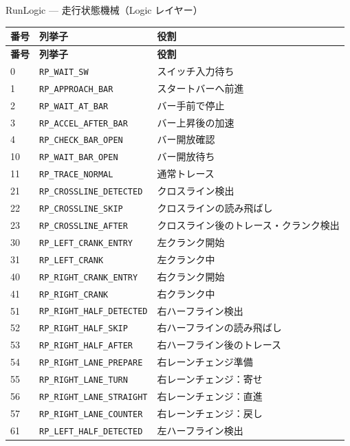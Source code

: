 \documentclass[a4paper,11pt,dvipdfmx]{jsarticle}
\begin{document}
\begin{apibox}{RunLogic --- 走行状態機械（Logic レイヤー）}
\begin{longtable}{l l l}
\toprule
\textbf{番号} & \textbf{列挙子} & \textbf{役割} \\
\midrule
\endfirsthead
\toprule
\textbf{番号} & \textbf{列挙子} & \textbf{役割} \\
\midrule
\endhead
0   & \texttt{RP\_WAIT\_SW}             & スイッチ入力待ち \\
1   & \texttt{RP\_APPROACH\_BAR}        & スタートバーへ前進 \\
2   & \texttt{RP\_WAIT\_AT\_BAR}        & バー手前で停止 \\
3   & \texttt{RP\_ACCEL\_AFTER\_BAR}    & バー上昇後の加速 \\
4   & \texttt{RP\_CHECK\_BAR\_OPEN}     & バー開放確認 \\
10  & \texttt{RP\_WAIT\_BAR\_OPEN}      & バー開放待ち \\
11  & \texttt{RP\_TRACE\_NORMAL}        & 通常トレース \\
21  & \texttt{RP\_CROSSLINE\_DETECTED}  & クロスライン検出 \\
22  & \texttt{RP\_CROSSLINE\_SKIP}      & クロスラインの読み飛ばし \\
23  & \texttt{RP\_CROSSLINE\_AFTER}     & クロスライン後のトレース・クランク検出 \\
30  & \texttt{RP\_LEFT\_CRANK\_ENTRY}   & 左クランク開始 \\
31  & \texttt{RP\_LEFT\_CRANK}          & 左クランク中 \\
40  & \texttt{RP\_RIGHT\_CRANK\_ENTRY}  & 右クランク開始 \\
41  & \texttt{RP\_RIGHT\_CRANK}         & 右クランク中 \\
51  & \texttt{RP\_RIGHT\_HALF\_DETECTED}& 右ハーフライン検出 \\
52  & \texttt{RP\_RIGHT\_HALF\_SKIP}    & 右ハーフラインの読み飛ばし \\
53  & \texttt{RP\_RIGHT\_HALF\_AFTER}   & 右ハーフライン後のトレース \\
54  & \texttt{RP\_RIGHT\_LANE\_PREPARE} & 右レーンチェンジ準備 \\
55  & \texttt{RP\_RIGHT\_LANE\_TURN}    & 右レーンチェンジ：寄せ \\
56  & \texttt{RP\_RIGHT\_LANE\_STRAIGHT}& 右レーンチェンジ：直進 \\
57  & \texttt{RP\_RIGHT\_LANE\_COUNTER} & 右レーンチェンジ：戻し \\
61  & \texttt{RP\_LEFT\_HALF\_DETECTED} & 左ハーフライン検出 \\

\end{longtable}
\end{apibox}
\end{document}
